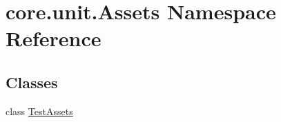 \hypertarget{namespacecore_1_1unit_1_1Assets}{\section{core.\-unit.\-Assets Namespace Reference}
\label{namespacecore_1_1unit_1_1Assets}
}
\subsection*{Classes}
\begin{DoxyCompactItemize}
\item 
class \hyperlink{classcore_1_1unit_1_1Assets_1_1TestAssets}{Test\-Assets}
\end{DoxyCompactItemize}
